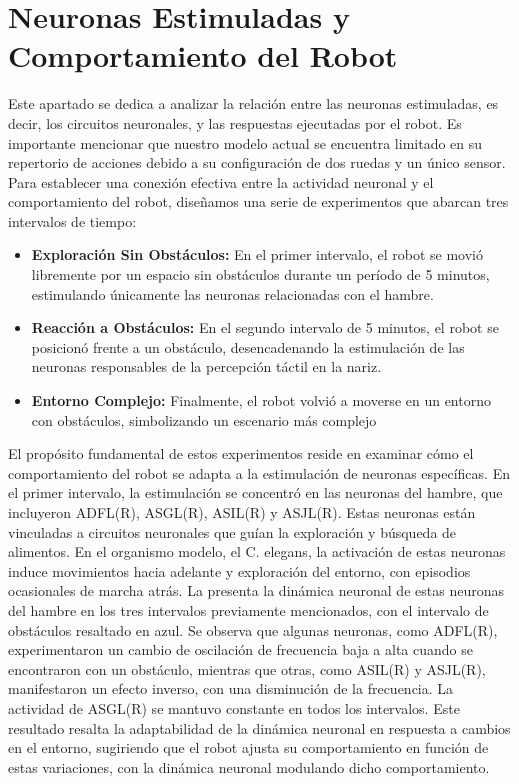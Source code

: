 \section{Neuronas Estimuladas y Comportamiento del Robot}\label{sec:estimuladas}


Este apartado se dedica a analizar la relación entre las neuronas estimuladas, es decir, los circuitos neuronales, y las respuestas ejecutadas por el robot. Es importante mencionar que nuestro modelo actual se encuentra limitado en su repertorio de acciones debido a su configuración de dos ruedas y un único sensor.  Para establecer una conexión efectiva entre la actividad neuronal y el comportamiento del robot, diseñamos una serie de experimentos que abarcan tres intervalos de tiempo:

\begin{itemize}
\item \textbf{Exploración Sin Obstáculos: } En el primer intervalo, el robot se movió libremente por un espacio sin obstáculos durante un período de 5 minutos, estimulando únicamente las neuronas relacionadas con el hambre.
\item \textbf{Reacción a Obstáculos: }  En el segundo intervalo de 5 minutos, el robot se posicionó frente a un obstáculo, desencadenando la estimulación de las neuronas responsables de la percepción táctil en la nariz.
\item \textbf{Entorno Complejo:} Finalmente, el robot volvió a moverse en un entorno con obstáculos, simbolizando un escenario más complejo
\end{itemize}

El propósito fundamental de estos experimentos reside en examinar cómo el comportamiento del robot se adapta a la estimulación de neuronas específicas. En el primer intervalo, la estimulación se concentró en las neuronas del hambre, que incluyeron ADFL(R), ASGL(R), ASIL(R) y ASJL(R). Estas neuronas están vinculadas a circuitos neuronales que guían la exploración y búsqueda de alimentos. En el organismo modelo, el C. elegans, la activación de estas neuronas induce movimientos hacia adelante y exploración del entorno, con episodios ocasionales de marcha atrás. La  presenta la dinámica neuronal de estas neuronas del hambre en los tres intervalos previamente mencionados, con el intervalo de obstáculos resaltado en azul. Se observa que algunas neuronas, como ADFL(R), experimentaron un cambio de oscilación de frecuencia baja a alta cuando se encontraron con un obstáculo, mientras que otras, como ASIL(R) y ASJL(R), manifestaron un efecto inverso, con una disminución de la frecuencia. La actividad de ASGL(R) se mantuvo constante en todos los intervalos. Este resultado resalta la adaptabilidad de la dinámica neuronal en respuesta a cambios en el entorno, sugiriendo que el robot ajusta su comportamiento en función de estas variaciones, con la dinámica neuronal modulando dicho comportamiento.

